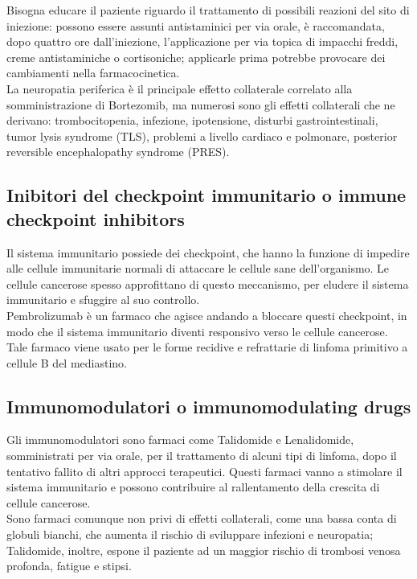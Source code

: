 Bisogna educare il paziente riguardo il trattamento di possibili reazioni del sito di iniezione: 
possono essere assunti antistaminici per via orale, è raccomandata, dopo quattro ore dall’iniezione, 
l’applicazione per via topica di impacchi freddi, creme antistaminiche o cortisoniche;
applicarle prima potrebbe provocare dei cambiamenti nella farmacocinetica\cite{BORTEZOMIB}.\\
La neuropatia periferica è il principale effetto collaterale correlato alla somministrazione di Bortezomib, 
ma numerosi sono gli effetti collaterali che ne derivano: trombocitopenia, infezione, ipotensione, disturbi 
gastrointestinali, tumor lysis syndrome (TLS), problemi a livello cardiaco e polmonare, posterior reversible 
encephalopathy syndrome (PRES)\cite{BORTNURSES}.

\subsection{Inibitori del checkpoint immunitario o immune checkpoint inhibitors}

Il sistema immunitario possiede dei checkpoint, che hanno la funzione di impedire alle cellule immunitarie normali di 
attaccare le cellule sane dell’organismo. Le cellule cancerose spesso approfittano di questo meccanismo, per eludere il 
sistema immunitario e sfuggire al suo controllo.\\ 
Pembrolizumab è un farmaco che agisce andando a bloccare questi checkpoint, in modo che il sistema immunitario 
diventi responsivo verso le cellule cancerose. Tale farmaco viene usato per le forme recidive e refrattarie di linfoma 
primitivo a cellule B del mediastino\cite{IMMUNOTP}.

\subsection{Immunomodulatori o immunomodulating drugs}

Gli immunomodulatori sono farmaci come Talidomide e Lenalidomide, somministrati per via orale, per il trattamento di 
alcuni tipi di linfoma, dopo il tentativo fallito di altri approcci terapeutici\cite{MASSIVEBIO}.
Questi farmaci vanno a stimolare il sistema immunitario e possono contribuire al rallentamento della crescita di 
cellule cancerose.\\
Sono farmaci comunque non privi di effetti collaterali, come una bassa conta di globuli bianchi, che aumenta il 
rischio di sviluppare infezioni e neuropatia; Talidomide, inoltre, espone il paziente ad un maggior rischio di trombosi 
venosa profonda, fatigue e stipsi\cite{IMMUNOTP}.


